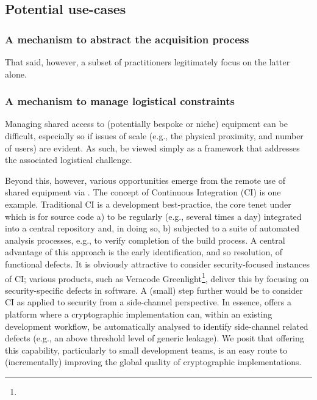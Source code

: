 
\subsection{Potential use-cases}


\subsubsection{A mechanism to abstract the acquisition process}


That said, however, a subset of practitioners legitimately focus on the
latter alone.



\subsubsection{A mechanism to manage logistical constraints}

Managing shared access to (potentially bespoke or niche) equipment can be 
difficult, especially so if issues of scale (e.g., the physical proximity, 
and number of users) are evident.  As such,  be viewed 
simply as a framework that addresses the associated logistical challenge.

Beyond this, however, various opportunities emerge from the remote use of
shared equipment via \LABID.  The concept of Continuous Integration (CI)
is one example.  Traditional CI is a development best-practice, the core 
tenet under which is for source code 
a) to be regularly (e.g., several times a day) integrated into a central repository 
   and, in doing so, 
b) subjected to a suite of automated analysis processes, e.g., to verify completion of the build process.
A central advantage of this approach is the early identification, and so
resolution, of functional defects.  
It is obviously attractive to consider security-focused instances of CI;
various products, such as Veracode Greenlight\footnote{
}, deliver this by focusing on security-specific defects in software.  A
(small) step further would be to consider CI as applied to security from
a side-channel perspective.  In essence, \LABID offers a platform where a 
cryptographic implementation can, within an existing development workflow,
be automatically analysed to identify side-channel related defects (e.g., 
an above threshold level of generic leakage).
We posit that offering this capability, particularly to small development
teams, is an easy route to (incrementally) improving the global quality 
of cryptographic implementations.

